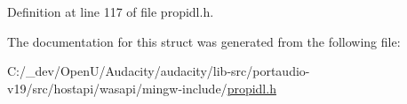 Definition at line 117 of file propidl.\+h.



The documentation for this struct was generated from the following file\+:\begin{DoxyCompactItemize}
\item 
C\+:/\+\_\+dev/\+Open\+U/\+Audacity/audacity/lib-\/src/portaudio-\/v19/src/hostapi/wasapi/mingw-\/include/\hyperlink{propidl_8h}{propidl.\+h}\end{DoxyCompactItemize}
